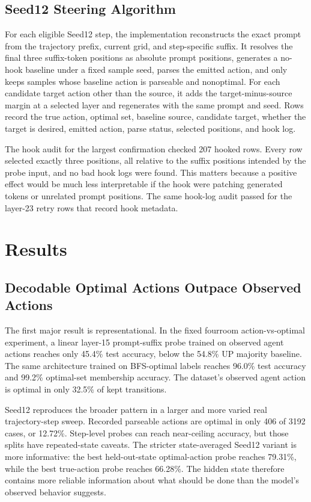 \documentclass[11pt]{article}
\begin{document}
\subsection{Seed12 Steering Algorithm}

For each eligible Seed12 step, the implementation reconstructs the exact prompt from the trajectory prefix, current grid, and step-specific suffix.
It resolves the final three suffix-token positions as absolute prompt positions, generates a no-hook baseline under a fixed sample seed, parses the emitted action, and only keeps samples whose baseline action is parseable and nonoptimal.
For each candidate target action other than the source, it adds the target-minus-source margin at a selected layer and regenerates with the same prompt and seed.
Rows record the true action, optimal set, baseline source, candidate target, whether the target is desired, emitted action, parse status, selected positions, and hook log.

The hook audit for the largest confirmation checked 207 hooked rows.
Every row selected exactly three positions, all relative to the suffix positions intended by the probe input, and no bad hook logs were found.
This matters because a positive effect would be much less interpretable if the hook were patching generated tokens or unrelated prompt positions.
The same hook-log audit passed for the layer-23 retry rows that record hook metadata.

\section{Results}

\subsection{Decodable Optimal Actions Outpace Observed Actions}

The first major result is representational.
In the fixed fourroom action-vs-optimal experiment, a linear layer-15 prompt-suffix probe trained on observed agent actions reaches only 45.4\% test accuracy, below the 54.8\% UP majority baseline.
The same architecture trained on BFS-optimal labels reaches 96.0\% test accuracy and 99.2\% optimal-set membership accuracy.
The dataset's observed agent action is optimal in only 32.5\% of kept transitions.

Seed12 reproduces the broader pattern in a larger and more varied real trajectory-step sweep.
Recorded parseable actions are optimal in only 406 of 3192 cases, or 12.72\%.
Step-level probes can reach near-ceiling accuracy, but those splits have repeated-state caveats.
The stricter state-averaged Seed12 variant is more informative: the best held-out-state optimal-action probe reaches 79.31\%, while the best true-action probe reaches 66.28\%.
The hidden state therefore contains more reliable information about what should be done than the model's observed behavior suggests.
\end{document}
